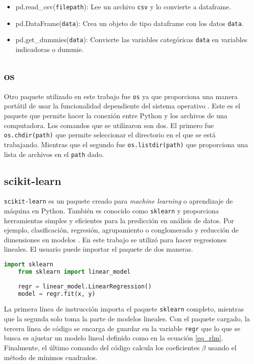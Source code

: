 \begin{itemize}
	\item pd.read\_csv(\texttt{filepath}): Lee un archivo \texttt{csv} y lo convierte a dataframe.
	
	\item pd.DataFrame(\texttt{data}): Crea un objeto de tipo dataframe con los datos \texttt{data}. 
	
	\item pd.get\_dummies(\texttt{data}): Convierte las variables categóricas \texttt{data} en variables indicadoras o dummie. 
\end{itemize}

\subsection{os}
Otro paquete utilizado en este trabajo fue \texttt{os} ya que proporciona una manera portátil de usar la funcionalidad dependiente del sistema operativo \citep{doc_python}. Este es el paquete que permite hacer la conexión entre \textsf{Python} y los archivos de una computadora. Los comandos que se utilizaron son dos. El primero fue \texttt{os.chdir(path)} que permite seleccionar el directorio en el que se está trabajando. Mientras que el segundo fue \texttt{os.listdir(path)} que proporciona una lista de archivos en el \texttt{path} dado. 


\subsection{scikit-learn} \label{sec_sklearn}
\texttt{scikit-learn} es un paquete creado para \textit{machine learning} o aprendizaje de máquina en \textsf{Python}. También es conocido como \texttt{sklearn} y proporciona herramientas simples y eficientes para la predicción en análisis de datos. Por ejemplo, clasificación, regresión, agrupamiento o conglomerado y reducción de dimensiones en modelos \citep{doc_python}. En este trabajo se utilizó para hacer regresiones lineales. El usuario puede importar el paquete de dos maneras. 

\begin{lstlisting}[language=Python]
	import sklearn
	from sklearn import linear_model
	
	regr = linear_model.LinearRegression()
	model = regr.fit(x, y)
\end{lstlisting}

La primera línea de instrucción importa el paquete \texttt{sklearn} completo, mientras que la segunda solo toma la parte de modelos lineales. Con el paquete cargado, la tercera línea de código se encarga de guardar en la variable \texttt{regr} que lo que se busca es ajustar un modelo lineal definido como en la ecuación \ref{eq_rlm}. Finalmente, el último comando del código calcula los coeficientes $\beta$  usando el método de mínimos cuadrados. 

